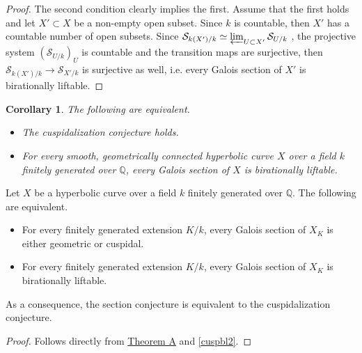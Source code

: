 \documentclass[11pt]{amsart}
\theoremstyle{plain}
\newtheorem{corollary}[theorem]{Corollary}
\theoremstyle{definition}
\newcommand{\1}{\mathbb{1}}
\newcommand{\mc}{\mathcal}
\newcommand{\Q}{\mathbb{Q}}
\renewcommand{\projlim}{\varprojlim}
\begin{document}
\begin{proof}
    The second condition clearly implies the first. Assume that the first holds and let $X'\subset X$ be a non-empty open subset. Since $k$ is countable, then $X'$ has a countable number of open subsets. Since $\mc{S}_{k(X')/k}\simeq\projlim_{U\subset X'}\mc{S}_{U/k}$ \cite[Lemma 259]{sti13}, the projective system $(\mc{S}_{U/k})_{U}$ is countable and the transition maps are surjective, then $\mc{S}_{k(X')/k}\to\mc{S}_{X'/k}$ is surjective as well, i.e. every Galois section of $X'$ is birationally liftable.
\end{proof}

\begin{corollary}\label{cuspbl2}
    The following are equivalent.
    \begin{itemize}
        \item The cuspidalization conjecture holds.
        \item For every smooth, geometrically connected hyperbolic curve $X$ over a field $k$ finitely generated over $\Q$, every Galois section of $X$ is birationally liftable.
    \end{itemize}
\end{corollary}

\begin{TB}\label{cuspeq}
	Let $X$ be a hyperbolic curve over a field $k$ finitely generated over $\Q$. The following are equivalent.
	\begin{itemize}
		\item For every finitely generated extension $K/k$, every Galois section of $X_{K}$ is either geometric or cuspidal.
		\item For every finitely generated extension $K/k$, every Galois section of $X_{K}$ is birationally liftable.
	\end{itemize}
        As a consequence, the section conjecture is equivalent to the cuspidalization conjecture.
        
	\begin{proof}
		Follows directly from \hyperlink{TA}{Theorem A} and \autoref{cuspbl2}.
	\end{proof}
\end{TB}
\end{document}
